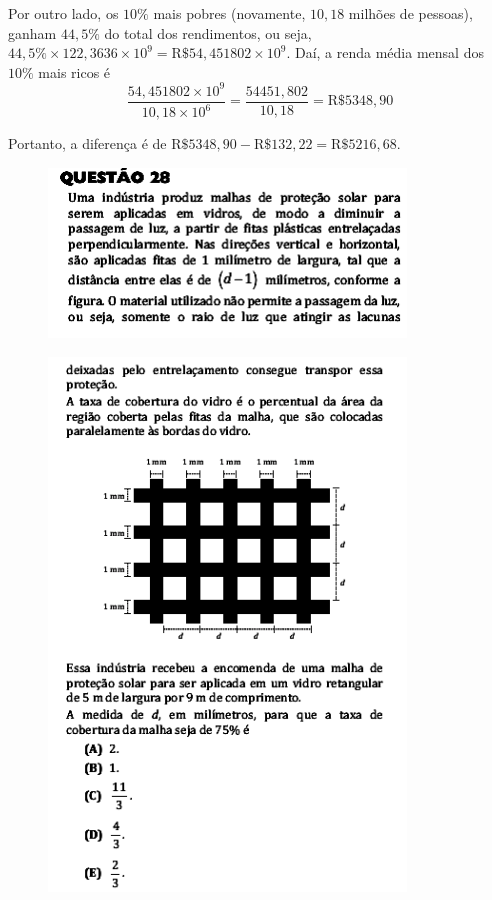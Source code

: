 \documentclass[a4paper]{article}
\begin{document}
\par\vspace{0.3cm} Por outro lado, os $10\%$ mais pobres (novamente, $10,18$ milhões de pessoas), ganham $44,5\%$ do total dos rendimentos, ou seja, $44,5\%\times 122,3636\times 10^9 = \text{R\$}54,451802\times 10^9$. Daí, a renda média mensal dos $10\%$ mais ricos é 
\begin{equation*}
\frac{54,451802\times 10^9}{10,18\times 10^6} = \frac{54451,802}{10,18} = \text{R\$}5348,90
\end{equation*}
\par\vspace{0.3cm} Portanto, a diferença é de $\text{R\$}5348,90 - \text{R\$}132,22 = \text{R\$}5216,68$.
\begin{figure}[H]
	\begin{center}
		\includegraphics[width=9.5cm]{L3Q28_1.png}
	\end{center}
\end{figure}
\begin{figure}[H]
	\begin{center}
		\includegraphics[width=9.5cm]{L3Q28_2.png}
	\end{center}
\end{figure}
\end{document}
